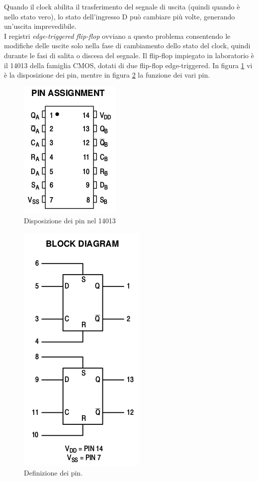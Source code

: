 \documentclass[journal, a4paper]{IEEEtran}
\begin{document}
Quando il clock abilita il trasferimento del segnale di uscita (quindi quando è nello stato vero), lo stato dell'ingresso D può cambiare più volte, generando un'uscita imprevedibile.\\
I registri \textit{edge-triggered flip-flop} ovviano a questo problema consentendo le modifiche delle uscite solo nella fase di cambiamento dello stato del clock, quindi durante le fasi di salita o discesa del segnale. Il flip-flop impiegato in laboratorio è il 14013 della famiglia CMOS, dotati di due flip-flop edge-triggered. In figura \ref{fig:pinass} vi è la disposizione dei pin, mentre in figura \ref{fig:pindef} la funzione dei vari pin.

\begin{figure}[htp]
\centering
\includegraphics[scale=.4]{pinass}
\caption{Disposizione dei pin nel 14013}
\label{fig:pinass}
\end{figure}

\begin{figure}[htp]
\centering
\includegraphics[scale=.4]{pindef}
\caption{Definizione dei pin.}
\label{fig:pindef}
\end{figure}
\end{document}
